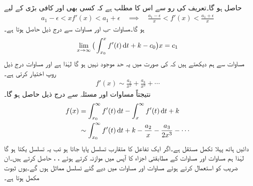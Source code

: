 حاصل ہو گا۔تعریف کی رو سے اس کا مطلب ہے کہ کسی بھی  اور کافی بڑی  کے لیے 
\begin{align}\label{مساوات_اعدادی_جزو_دو_جزو_تفرق_ج}
a_1-\epsilon<xf'(x)<a_1+\epsilon\quad \implies \quad \frac{a_1-\epsilon}{x}<f'(x)<\frac{a_1+\epsilon}{x}
\end{align}
ہو گا۔مساوات -ب اور مساوات  سے درج ذیل حاصل ہوتا ہے۔
\begin{align*}
\lim_{x\to\infty} \big(\int_{x_0}^{x} f'(t)\dif t+k-c_0\big)x=c_1
\end{align*}
مساوات  سے ہم دیکھتے ہیں کہ  کی صورت میں یہ حد موجود نہیں ہو گا لہٰذا  ہے اور مساوات  درج ذیل روپ اختیار کرتی ہے۔
\begin{align*}
f'(x)\sim \frac{a_2}{x^2}+\frac{a_3}{x^3}+\cdots
\end{align*}
نتیجتاً مساوات  اور مسئلہ  سے درج ذیل حاصل ہو گا۔
\begin{gather}
\begin{aligned}\label{مساوات_اعدادی_جزو_دو_جزو_تفرق_چ}
f(x)&=\int_{x_0}^{\infty}f'(t)\dif t-\int_{x}^{\infty}f'(t)\dif t+k\\
&\sim \int_{x_0}^{\infty} f'(t)\dif t+k-\frac{a_2}{x}-\frac{a_3}{2x^3}-\cdots
\end{aligned}
\end{gather}
دائیں ہاتھ پہلا تکمل مستقل ہے۔اگر ایک تفاعل کا متقارب تسلسل پایا جاتا ہو تب یہ تسلسل یکتا ہو گا لہٰذا ہم مساوات  اور مساوات  کے مطابقتی اجزاء کا آپس میں موازنہ کرتے ہوئے ، ،  حاصل کرتے ہیں۔ان  ضریب  کو استعمال کرتے ہوئے  مساوات  اور مساوات  میں دیے گئے تسلسل مماثل ہوں گے۔یوں ثبوت مکمل ہوتا ہے۔


